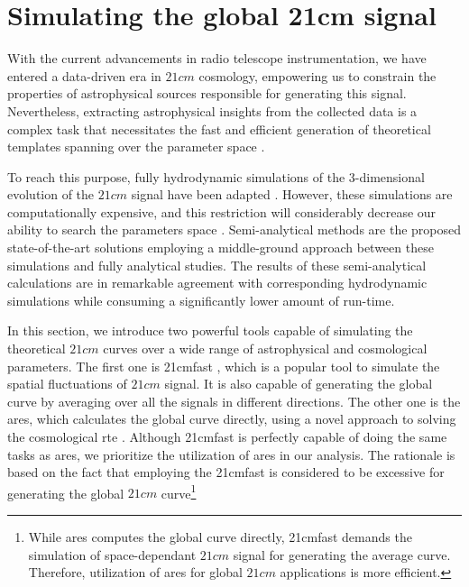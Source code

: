 \documentclass[12pt, TexShade, letterpaper]{report}
\begin{document}
\section{Simulating the global 21cm signal}
With the current advancements in radio telescope instrumentation, we have entered a data-driven era in $21cm$ cosmology, empowering us to constrain the properties of astrophysical sources responsible for generating this signal. Nevertheless, extracting astrophysical insights from the collected data is a complex task that necessitates the fast and efficient generation of theoretical templates spanning over the parameter space \cite{emulate_21cm}. \par
To reach this purpose, fully hydrodynamic simulations of the 3-dimensional evolution of the $21cm$ signal have been adapted \cite{hydrodynamic_sim}. However, these simulations are computationally expensive, and this restriction will considerably decrease our ability to search the parameters space \cite{ares2014jordan}. 
Semi-analytical methods are the proposed state-of-the-art solutions employing a middle-ground approach between these simulations and fully analytical studies. The results of these semi-analytical calculations are in remarkable agreement with corresponding hydrodynamic simulations while consuming a significantly lower amount of run-time. \par
In this section, we introduce two powerful tools capable of simulating the theoretical $21cm$ curves over a wide range of astrophysical and cosmological parameters. The first one is \gls{21cmfast} \cite{21cmfast_c, 21cmfast_python}, which is a popular tool to simulate the spatial fluctuations of $21cm$ signal. It is also capable of generating the global curve by averaging over all the signals in different directions. The other one is the \gls{ares}, which calculates the global curve directly, using a novel approach to solving the cosmological \gls{rte} \cite{ares2014jordan}. Although \gls{21cmfast} is perfectly capable of doing the same tasks as \gls{ares}, we prioritize the utilization of \gls{ares} in our analysis. The rationale is based on the fact that employing the \gls{21cmfast} is considered to be excessive for generating the global $21cm$ curve\footnote{While \gls{ares} computes the global curve directly, \gls{21cmfast} demands the simulation of space-dependant 
 $21cm$ signal for generating the average curve. Therefore, utilization of \gls{ares} for global $21cm$ applications is more efficient.}\par
\end{document}
